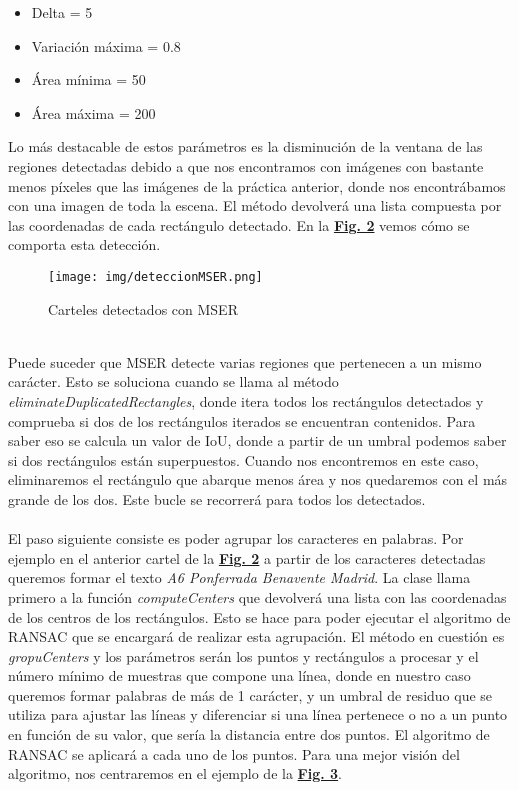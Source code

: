 \documentclass[a4paper, 12pt]{article}
\begin{document}
\begin{itemize}
    \item Delta = 5
    \item Variación máxima = 0.8
    \item Área mínima = 50
    \item Área máxima = 200
\end{itemize}
Lo más destacable de estos parámetros es la disminución de la ventana de las regiones detectadas debido a que nos encontramos con imágenes con bastante menos píxeles que las imágenes de la práctica anterior, donde nos encontrábamos con una imagen de toda la escena. El método devolverá una lista compuesta por las coordenadas de cada rectángulo detectado. En la \textbf{\hyperref[fig:normalizacion]{Fig. 2}} vemos cómo se comporta esta detección. 
\begin{figure}[h]
	\centering
	\texttt{[image: img/deteccionMSER.png]}
 	\caption{Carteles detectados con MSER}\vspace{0.5cm}
	\label{fig:normalizacion}
\end{figure}
\\Puede suceder que MSER detecte varias regiones que pertenecen a un mismo carácter. Esto se soluciona cuando se llama al método \textit{eliminateDuplicatedRectangles}, donde itera todos los rectángulos detectados y comprueba si dos de los rectángulos iterados se encuentran contenidos. Para saber eso se calcula un valor de IoU, donde a partir de un umbral podemos saber si dos rectángulos están superpuestos. Cuando nos encontremos en este caso, eliminaremos el rectángulo que abarque menos área y nos quedaremos con el más grande de los dos. Este bucle se recorrerá para todos los detectados.
\\\\
El paso siguiente consiste es poder agrupar los caracteres en palabras. Por ejemplo en el anterior cartel de la \textbf{\hyperref[fig:normalizacion]{Fig. 2}} a partir de los caracteres detectadas queremos formar el texto \textit{A6 Ponferrada Benavente Madrid}. La clase llama primero a la función \textit{computeCenters} que devolverá una lista con las coordenadas de los centros de los rectángulos. Esto se hace para poder ejecutar el algoritmo de RANSAC que se encargará de realizar esta agrupación. El método en cuestión es \textit{gropuCenters} y los parámetros serán los puntos y rectángulos a procesar y el número mínimo de muestras que compone una línea, donde en nuestro caso queremos formar palabras de más de 1 carácter, y un umbral de residuo que se utiliza para ajustar las líneas y diferenciar si una línea pertenece o no a un punto en función de su valor, que sería la distancia entre dos puntos. El algoritmo de RANSAC se aplicará a cada uno de los puntos. Para una mejor visión del algoritmo, nos centraremos en el ejemplo de la \textbf{\hyperref[fig:normalizacion]{Fig. 3}}.
\end{document}
